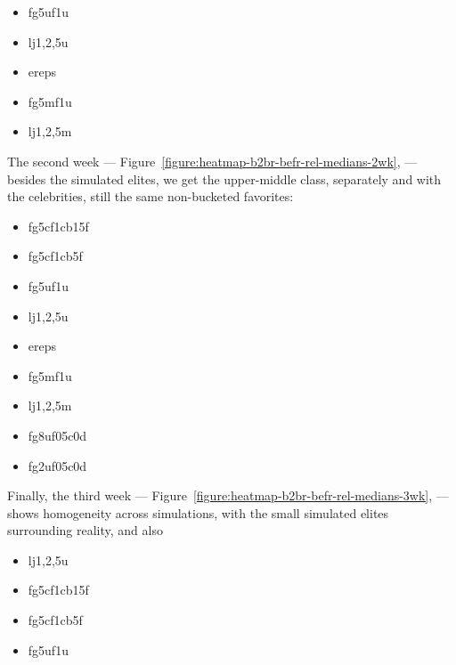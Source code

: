 \documentclass[10pt,oneside]{memoir}
\begin{document}
\begin{Spacing}{2}
\begin{itemize}


\item fg5uf1u

\item lj{1,2,5}u

\item ereps

\item fg5mf1u

\item lj{1,2,5}m
\end{itemize}

The second week --- Figure~\ref{figure:heatmap-b2br-befr-rel-medians-2wk}, ---  besides the simulated elites, we get the upper-middle class, separately and with the celebrities, still the same non-bucketed favorites:


\begin{itemize}


\item fg5cf1cb15f

\item fg5cf1cb5f

\item fg5uf1u

\item lj{1,2,5}u

\item ereps

\item fg5mf1u

\item lj{1,2,5}m

\item fg8uf05c0d

\item fg2uf05c0d
\end{itemize}

Finally, the third week --- Figure~\ref{figure:heatmap-b2br-befr-rel-medians-3wk}, ---  shows homogeneity across simulations, with the small simulated elites surrounding reality, and also


\begin{itemize}


\item lj{1,2,5}u

\item fg5cf1cb15f

\item fg5cf1cb5f

\item fg5uf1u


\end{itemize}
\end{Spacing}
\end{document}
